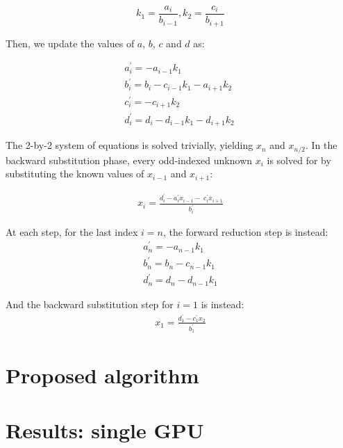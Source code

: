 \documentclass{elsarticle}
\begin{document}
\begin{equation*}
k_1 = \frac{a_i}{b_{i-1}},
k_2 = \frac{c_i}{b_{i+1}}
\end{equation*}

Then, we update the values of $a$, $b$, $c$ and $d$ as:

\begin{align} \label{eqn:forward-reduction}
& a^{\prime}_i = -a_{i-1}k_1 & \\
& b^{\prime}_i = b_i - c_{i-1}k_1 - a_{i+1}k_2 & \\
& c^{\prime}_i = -c_{i+1}k_2 & \\
& d^{\prime}_i = d_i - d_{i-1}k_1  - d_{i+1}k_2 \
    \label{eqn:forward-reduction-rhs}&
\end{align}

The 2-by-2 system of equations is solved trivially,
yielding $x_n$ and $x_{n/2}$.
In the backward substitution phase,
every odd-indexed unknown $x_i$ is solved for by
substituting the known values of $x_{i-1}$ and $x_{i+1}$:

\begin{align} \label{eqn:back-substitution}
x_i = \frac{d^{\prime}_i - a^{\prime}_ix_{i-1} - \
    c^{\prime}_ix_{i+1}}{b^{\prime}_i}
\end{align}

At each step, for the last index $i=n$,
the forward reduction step is instead:
\begin{align} \label{eqn:forward-reduction-last}
    & a^{\prime}_n = -a_{n-1}k_1 & \\
    & b^{\prime}_n = b_n - c_{n-1}k_1 & \\
    & d^{\prime}_n = d_n - d_{n-1}k_1&
\end{align}

And the backward substitution step for $i=1$ is instead:
\begin{align} \label{eqn:back-substitution-first}
x_1 = \frac{d^{\prime}_1 - c^{\prime}_1x_{2}}{b^{\prime}_1}
\end{align}


\section{Proposed algorithm} \label{sec:proposed-algorithm}

\section{Results: single GPU} \label{sec:results-single-gpu}
\end{document}
